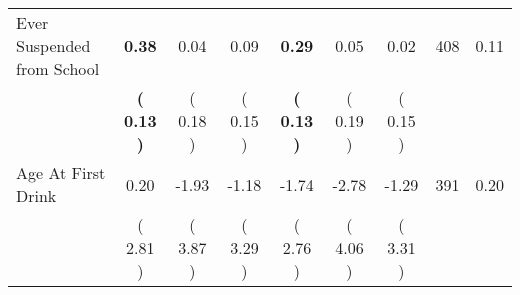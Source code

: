 \begin{tabular}{lcccccccc}
Ever Suspended from School & \textbf{     0.38} &      0.04 &      0.09 & \textbf{     0.29} &      0.05 &      0.02 & 408 &       0.11 \\ 
 & \textbf{(     0.13 )} & (     0.18 ) & (     0.15 ) & \textbf{(     0.13 )} & (     0.19 ) & (     0.15 ) & \\
Age At First Drink &      0.20 &     -1.93 &     -1.18 &     -1.74 &     -2.78 &     -1.29 & 391 &       0.20 \\ 
 & (     2.81 ) & (     3.87 ) & (     3.29 ) & (     2.76 ) & (     4.06 ) & (     3.31 ) & \\
\bottomrule
\end{tabular}
